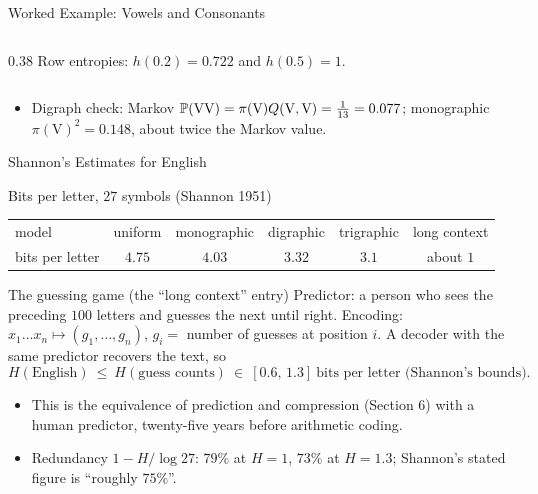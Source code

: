 \begin{frame}{Worked Example: Vowels and Consonants}
\begin{columns}[T]
\begin{column}{0.38\textwidth}
      {\footnotesize Row entropies: $h(0.2)=0.722$ and $h(0.5)=1$.}
    \end{column}
  \end{columns}
  \begin{itemize}
    \item Digraph check: Markov $\mathbb{P}(\mathrm{VV})=\pi(\mathrm V)Q(\mathrm V,\mathrm V)=\tfrac1{13}=0.077$; monographic $\pi(\mathrm V)^2=0.148$, about twice the Markov value.
  \end{itemize}
\end{frame}

\begin{frame}{Shannon's Estimates for English}
  \small
  \begin{block}{Bits per letter, $27$ symbols (Shannon 1951)}
    \centering
    \renewcommand{\arraystretch}{1.25}
    \begin{tabular}{@{}lccccc@{}}
      \toprule
      model & uniform & monographic & digraphic & trigraphic & long context \\
      bits per letter & $4.75$ & $4.03$ & $3.32$ & $3.1$ & about $1$ \\
      \bottomrule
    \end{tabular}
  \end{block}
  \begin{block}{The guessing game (the ``long context'' entry)}
    Predictor: a person who sees the preceding $100$ letters and guesses the next until right. Encoding: $x_1\dots x_n\mapsto(g_1,\dots,g_n)$, $g_i=$ number of guesses at position $i$.
    A decoder with the same predictor recovers the text, so
    \[
      H(\text{English})\ \le\ H(\text{guess counts})\ \in\ [0.6,\,1.3]\ \text{bits per letter (Shannon's bounds).}
    \]
  \end{block}
  \begin{itemize}
    \item This is the equivalence of prediction and compression (Section 6) with a human predictor, twenty-five years before arithmetic coding.
    \item Redundancy $1-H/\log27$: $79\%$ at $H=1$, $73\%$ at $H=1.3$; Shannon's stated figure is ``roughly $75\%$''.
  \end{itemize}
\end{frame}

